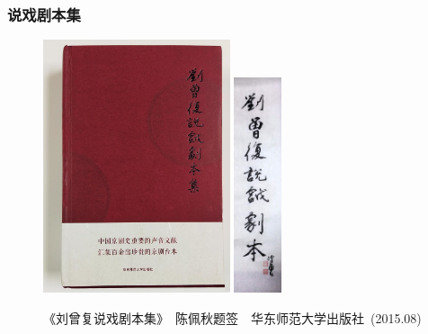 \documentclass[cjk,slidestop,compress,mathserif,blue]{beamer}
\begin{document}

\frame
{
	\frametitle{说戏剧本集}
\begin{figure}[h!]
\centering
\vspace{-10.5pt}
\includegraphics[height=0.68\textwidth,width=0.49\textwidth,viewport=0 0 1030 1400,clip]{Figures_Peking-Opera/Liu_script.jpg}
\includegraphics[height=0.68\textwidth,width=0.125\textwidth,viewport=0 0 620 2850,clip]{Figures_Peking-Opera/Liu_script-Inscription.JPG}
\caption{\fontsize{6.1pt}{3.9pt}\selectfont\textrm{《刘曾复说戏剧本集》~陈佩秋题签~~华东师范大学出版社~(2015.08)}}
\label{Peking_Opera_Script-2015}
\end{figure}
}
\end{document}
